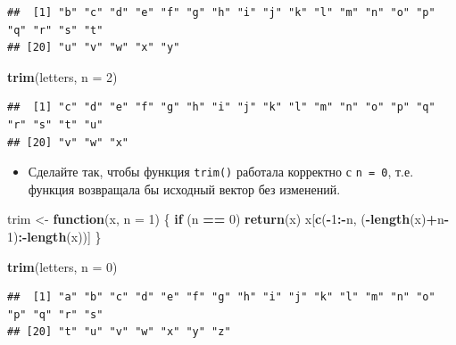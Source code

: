 \documentclass[]{book}
\newenvironment{Shaded}{\begin{snugshade}}{\end{snugshade}}
\newcommand{\KeywordTok}[1]{\textcolor[rgb]{0.13,0.29,0.53}{\textbf{#1}}}
\newcommand{\DataTypeTok}[1]{\textcolor[rgb]{0.13,0.29,0.53}{#1}}
\newcommand{\DecValTok}[1]{\textcolor[rgb]{0.00,0.00,0.81}{#1}}
\newcommand{\StringTok}[1]{\textcolor[rgb]{0.31,0.60,0.02}{#1}}
\newcommand{\ControlFlowTok}[1]{\textcolor[rgb]{0.13,0.29,0.53}{\textbf{#1}}}
\newcommand{\OperatorTok}[1]{\textcolor[rgb]{0.81,0.36,0.00}{\textbf{#1}}}
\newcommand{\NormalTok}[1]{#1}
\providecommand{\tightlist}{%
  \setlength{\itemsep}{0pt}\setlength{\parskip}{0pt}}
\begin{document}
\begin{verbatim}
##  [1] "b" "c" "d" "e" "f" "g" "h" "i" "j" "k" "l" "m" "n" "o" "p" "q" "r" "s" "t"
## [20] "u" "v" "w" "x" "y"
\end{verbatim}

\begin{Shaded}
\begin{Highlighting}[]
\KeywordTok{trim}\NormalTok{(letters, }\DataTypeTok{n =} \DecValTok{2}\NormalTok{)}
\end{Highlighting}
\end{Shaded}

\begin{verbatim}
##  [1] "c" "d" "e" "f" "g" "h" "i" "j" "k" "l" "m" "n" "o" "p" "q" "r" "s" "t" "u"
## [20] "v" "w" "x"
\end{verbatim}

\begin{itemize}
\tightlist
\item
  Сделайте так, чтобы функция \texttt{trim()} работала корректно с
  \texttt{n\ =\ 0}, т.е. функция возвращала бы исходный вектор без
  изменений.
\end{itemize}

\begin{Shaded}
\begin{Highlighting}[]
\NormalTok{trim <-}\StringTok{ }\ControlFlowTok{function}\NormalTok{(x, }\DataTypeTok{n =} \DecValTok{1}\NormalTok{) \{}
  \ControlFlowTok{if}\NormalTok{ (n }\OperatorTok{==}\StringTok{ }\DecValTok{0}\NormalTok{) }\KeywordTok{return}\NormalTok{(x)}
\NormalTok{  x[}\KeywordTok{c}\NormalTok{(}\OperatorTok{-}\DecValTok{1}\OperatorTok{:-}\NormalTok{n, (}\OperatorTok{-}\KeywordTok{length}\NormalTok{(x)}\OperatorTok{+}\NormalTok{n}\OperatorTok{-}\DecValTok{1}\NormalTok{)}\OperatorTok{:-}\KeywordTok{length}\NormalTok{(x))]}
\NormalTok{\}}
\end{Highlighting}
\end{Shaded}

\begin{Shaded}
\begin{Highlighting}[]
\KeywordTok{trim}\NormalTok{(letters, }\DataTypeTok{n =} \DecValTok{0}\NormalTok{)}
\end{Highlighting}
\end{Shaded}

\begin{verbatim}
##  [1] "a" "b" "c" "d" "e" "f" "g" "h" "i" "j" "k" "l" "m" "n" "o" "p" "q" "r" "s"
## [20] "t" "u" "v" "w" "x" "y" "z"
\end{verbatim}
\end{document}
